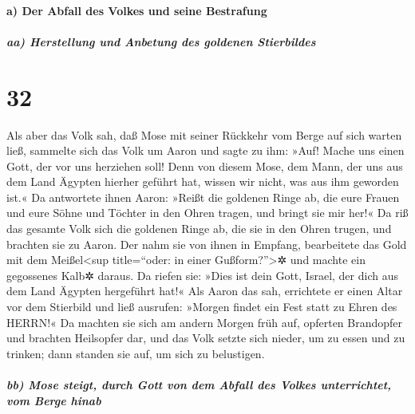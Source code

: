 \hypertarget{a-der-abfall-des-volkes-und-seine-bestrafung}{%
\paragraph{a) Der Abfall des Volkes und seine
Bestrafung}\label{a-der-abfall-des-volkes-und-seine-bestrafung}}

\hypertarget{aa-herstellung-und-anbetung-des-goldenen-stierbildes}{%
\subparagraph{aa) Herstellung und Anbetung des goldenen
Stierbildes}\label{aa-herstellung-und-anbetung-des-goldenen-stierbildes}}

\hypertarget{section-31}{%
\section{32}\label{section-31}}

 Als aber das Volk sah, daß Mose mit seiner Rückkehr vom
Berge auf sich warten ließ, sammelte sich das Volk um Aaron und sagte zu
ihm: »Auf! Mache uns einen Gott, der vor uns herziehen soll! Denn von
diesem Mose, dem Mann, der uns aus dem Land Ägypten hierher geführt hat,
wissen wir nicht, was aus ihm geworden ist.«  Da
antwortete ihnen Aaron: »Reißt die goldenen Ringe ab, die eure Frauen
und eure Söhne und Töchter in den Ohren tragen, und bringt sie mir her!«
 Da riß das gesamte Volk sich die goldenen Ringe ab, die
sie in den Ohren trugen, und brachten sie zu Aaron.  Der
nahm sie von ihnen in Empfang, bearbeitete das Gold mit dem
Meißel\textless sup title=``oder: in einer Gußform?''\textgreater✲ und
machte ein gegossenes Kalb✲ daraus. Da riefen sie: »Dies ist dein Gott,
Israel, der dich aus dem Land Ägypten hergeführt hat!« 
Als Aaron das sah, errichtete er einen Altar vor dem Stierbild und ließ
ausrufen: »Morgen findet ein Fest statt zu Ehren des HERRN!«
 Da machten sie sich am andern Morgen früh auf, opferten
Brandopfer und brachten Heilsopfer dar, und das Volk setzte sich nieder,
um zu essen und zu trinken; dann standen sie auf, um sich zu belustigen.

\hypertarget{bb-mose-steigt-durch-gott-von-dem-abfall-des-volkes-unterrichtet-vom-berge-hinab}{%
\subparagraph{bb) Mose steigt, durch Gott von dem Abfall des Volkes
unterrichtet, vom Berge
hinab}\label{bb-mose-steigt-durch-gott-von-dem-abfall-des-volkes-unterrichtet-vom-berge-hinab}}

